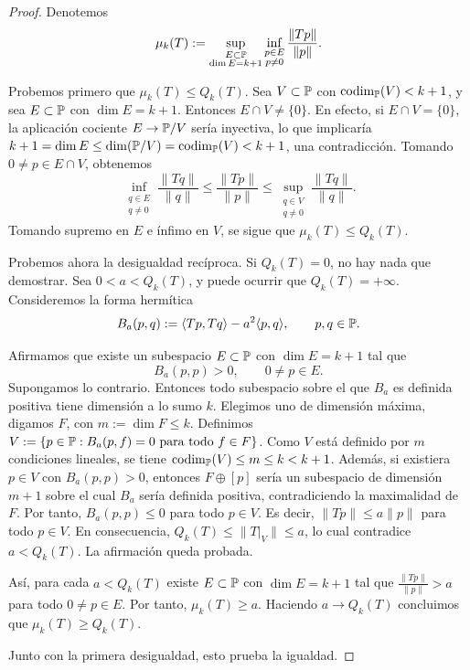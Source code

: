 \begin{proof}
	Denotemos
	\[
		\mu_k(T):=
		\sup_{\substack{E\subset\mathbb{P}\\ \dim E=k+1}}
		\inf_{\substack{p\in E\\ p\ne0}}
		\frac{\|Tp\|}{\|p\|}.
	\]

	Probemos primero que $\mu_k(T)\le Q_k(T)$. Sea $V\subset\mathbb{P}$ con \(\operatorname{codim}_{\mathbb{P}}(V)<k+1\), y sea $E\subset\mathbb{P}$ con $\dim E=k+1$. Entonces \(E\cap V\ne\{0\}\).
	En efecto, si $E\cap V=\{0\}$, la aplicación cociente $E\to\mathbb{P}/V$ sería inyectiva, lo que implicaría $k+1=\dim E\le \dim(\mathbb{P}/V)=\operatorname{codim}_{\mathbb{P}}(V)<k+1$,
	una contradicción. Tomando $0\ne p\in E\cap V$, obtenemos
	\[
		\inf_{\substack{q\in E\\ q\ne0}}
		\frac{\|Tq\|}{\|q\|}
		\le
		\frac{\|Tp\|}{\|p\|}
		\le
		\sup_{\substack{q\in V\\ q\ne0}}
		\frac{\|Tq\|}{\|q\|}.
	\]
	Tomando supremo en $E$ e ínfimo en $V$, se sigue que \(\mu_k(T)\le Q_k(T)\).

	Probemos ahora la desigualdad recíproca. Si $Q_k(T)=0$, no hay nada que demostrar. Sea $0<a<Q_k(T)$, y puede ocurrir que $Q_k(T)=+\infty$. Consideremos la forma hermítica
	\[
		B_a(p,q):=\langle Tp,Tq\rangle-a^2\langle p,q\rangle,
		\qquad p,q\in\mathbb{P}.
	\]

	Afirmamos que existe un subespacio $E\subset\mathbb{P}$ con $\dim E=k+1$ tal que
	\[
		B_a(p,p)>0,
		\qquad 0\ne p\in E.
	\]
	Supongamos lo contrario. Entonces todo subespacio sobre el que $B_a$ es definida positiva tiene dimensión a lo sumo $k$. Elegimos uno de dimensión máxima, digamos $F$, con \(m:=\dim F\le k\).
	Definimos $V:=\{p\in\Poly: B_a(p,f)=0\ \text{para todo }f\in F\}$.
	Como $V$ está definido por $m$ condiciones lineales, se tiene \(\operatorname{codim}_{\mathbb{P}}(V)\le m\le k<k+1\).
	Además, si existiera $p\in V$ con $B_a(p,p)>0$, entonces $F\oplus[p]$ sería un subespacio de dimensión $m+1$ sobre el cual $B_a$ sería definida positiva, contradiciendo la maximalidad de $F$. Por tanto, \(B_a(p,p)\le0\) para todo \(p\in V\). Es decir, \(\|Tp\|\le a\|p\|\) para todo \(p\in V\).
	En consecuencia, \(Q_k(T)\le \|T|_V\|\le a\),
	lo cual contradice $a<Q_k(T)$. La afirmación queda probada.

	Así, para cada $a<Q_k(T)$ existe $E\subset\mathbb{P}$ con $\dim E=k+1$ tal que $\frac{\|Tp\|}{\|p\|}>a$ para todo $0\ne p\in E$.
	Por tanto, \(\mu_k(T)\ge a\).
	Haciendo \(a\to Q_k(T)\) concluimos que \(\mu_k(T)\ge Q_k(T)\).

	Junto con la primera desigualdad, esto prueba la igualdad.
\end{proof}


